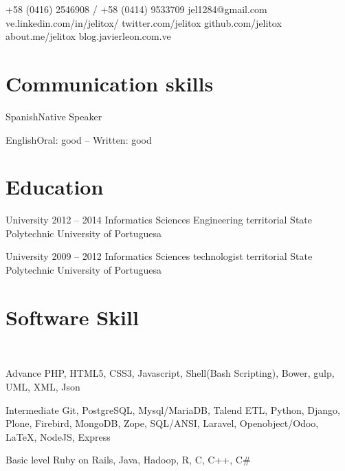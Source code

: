 \documentclass{tccv}
\begin{document}
    {+58 (0416) 2546908 / +58 (0414) 9533709}
    {jel1284@gmail.com}
    {ve.linkedin.com/in/jelitox/}
    {twitter.com/jelitox}
    {github.com/jelitox}
    {about.me/jelitox}
    {blog.javierleon.com.ve}

\section{Communication skills}

\begin{idiomas}
\item{Spanish}{Native Speaker}
\item{English}{Oral: good -- Written: good}
\end{idiomas}
\section{Education}

\begin{estudios}

\item[University]{2012 -- 2014}
     {Informatics Sciences Engineering}
     {territorial State Polytechnic University of Portuguesa}

\item[University]{2009 -- 2012}
     {Informatics Sciences technologist}
     {territorial State Polytechnic University of Portuguesa}

\end{estudios}

\section{Software Skill}

\begin{software}
\\
\item{Advance}
     {PHP, HTML5, CSS3, Javascript, Shell(Bash Scripting), Bower, gulp, UML, XML, Json} \\
\item{Intermediate}
     {Git, PostgreSQL, Mysql/MariaDB, Talend ETL, Python, Django, Plone, Firebird, MongoDB, Zope, SQL/ANSI, Laravel, Openobject/Odoo, \LaTeX, NodeJS, Express } \\
\item{Basic level}
     {Ruby on Rails, Java, Hadoop, R, C, C++, C\#} \\

\end{software}
\end{document}
